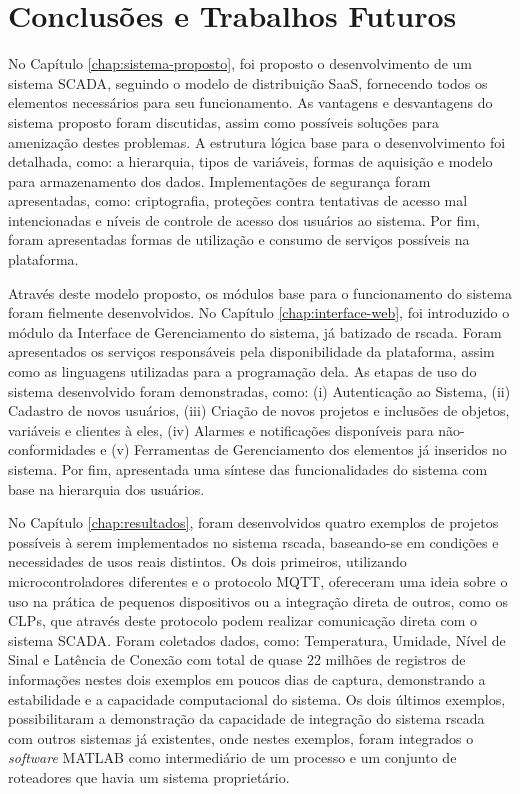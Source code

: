 \chapter{Conclusões e Trabalhos Futuros}
\label{chap:conclusoes-e-trabalhos-futuros}

No Capítulo \ref{chap:sistema-proposto}, foi proposto o desenvolvimento de um sistema \gls{SCADA}, seguindo o modelo de distribuição \gls{SaaS}, fornecendo todos os elementos necessários para seu funcionamento. As vantagens e desvantagens do sistema proposto foram discutidas, assim como possíveis soluções para amenização destes problemas. A estrutura lógica base para o desenvolvimento foi detalhada, como: a hierarquia, tipos de variáveis, formas de aquisição e  modelo para armazenamento dos dados. Implementações de segurança foram apresentadas, como: criptografia, proteções contra tentativas de acesso mal intencionadas e níveis de controle de acesso dos usuários ao sistema. Por fim, foram apresentadas formas de utilização e consumo de serviços possíveis na plataforma.

Através deste modelo proposto, os módulos base para o funcionamento do sistema foram fielmente desenvolvidos. No Capítulo \ref{chap:interface-web}, foi introduzido o módulo da Interface de Gerenciamento do sistema, já batizado de rscada. Foram apresentados os serviços responsáveis pela disponibilidade da plataforma, assim como as linguagens utilizadas para a programação dela. As  etapas de uso do sistema desenvolvido foram demonstradas, como: (i) Autenticação ao Sistema, (ii) Cadastro de novos usuários, (iii) Criação de novos projetos e inclusões de objetos, variáveis e clientes à eles, (iv) Alarmes e notificações disponíveis para não-conformidades e (v) Ferramentas de Gerenciamento dos elementos já inseridos no sistema. Por fim, apresentada uma síntese das  funcionalidades do sistema com base na hierarquia dos usuários.

No Capítulo \ref{chap:resultados}, foram desenvolvidos quatro exemplos de projetos possíveis à serem implementados no sistema rscada, baseando-se em condições e necessidades de usos reais distintos. Os dois primeiros, utilizando microcontroladores diferentes e o protocolo \gls{MQTT}, ofereceram uma ideia sobre o uso na prática de pequenos dispositivos ou a integração direta de outros, como os \glspl{CLP}, que através deste protocolo podem realizar comunicação direta com o sistema \gls{SCADA}. Foram coletados dados, como: Temperatura, Umidade, Nível de Sinal e Latência de Conexão com total de quase 22 milhões de registros de informações nestes dois exemplos em poucos dias de captura, demonstrando a estabilidade e a capacidade computacional do sistema. Os dois últimos exemplos, possibilitaram a demonstração da capacidade de integração do sistema rscada com outros sistemas já existentes, onde nestes exemplos, foram integrados o \textit{software} MATLAB como intermediário de um processo e um conjunto de roteadores que havia um sistema proprietário.

